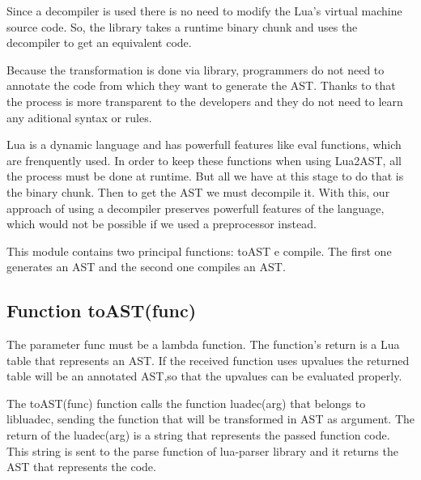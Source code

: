 \documentclass[english]{llncs}
\begin{document}
Since a decompiler is used there is no need to modify the Lua's virtual machine source code.
So, the library takes a runtime binary chunk and uses the decompiler to get an equivalent code.

Because the transformation is done via library, programmers do not need to annotate the code from which they want to generate the AST.
Thanks to that the process is more transparent to the developers and they do not need to learn any aditional syntax or rules.


Lua is a dynamic language and has powerfull features like eval functions, which  are frenquently used.
In order to keep these functions when using Lua2AST, all the process must be done at runtime.
But all we have at this stage to do that is the binary chunk. 
Then to get the AST we must decompile it.
With this, our approach of using a decompiler preserves powerfull features of the language, which would not be possible if we used a preprocessor instead.


This module contains two principal functions: toAST e compile.
The first one generates an AST and the second one compiles an AST.

\subsection{Function toAST(func) }

The parameter func must be a lambda function.
The function's return is a Lua table that represents an AST.
If the received function uses upvalues the returned table will be an annotated AST,so that the upvalues can be evaluated properly.

The toAST(func) function calls the function luadec(arg) that belongs to libluadec, sending the function that will be transformed in AST as argument.
The return of the luadec(arg) is a string that represents the passed function code.
This string is sent to the parse function of lua-parser library and it returns the AST that represents the code.
\end{document}
